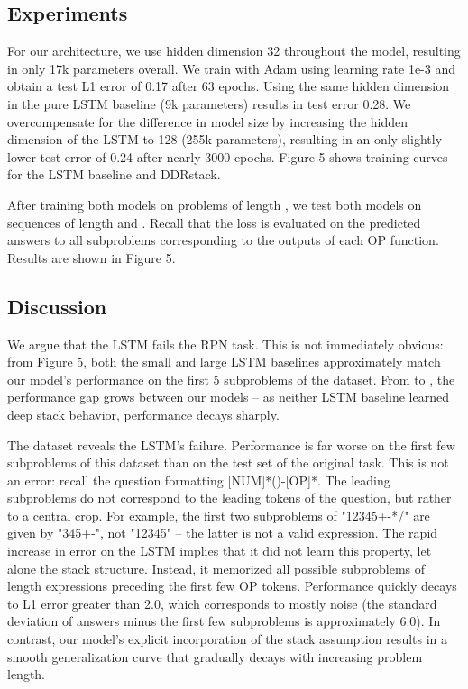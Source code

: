 \documentclass{article}
\begin{document}
\subsection{Experiments}
For our architecture, we use hidden dimension 32 throughout the model, resulting in only 17k parameters overall. We train with Adam using learning rate 1e-3 and obtain a test L1 error of 0.17 after 63 epochs. Using the same hidden dimension in the pure LSTM baseline (9k parameters) results in test error 0.28. We overcompensate for the difference in model size by increasing the hidden dimension of the LSTM to 128 (255k parameters), resulting in an only slightly lower test error of 0.24 after nearly 3000 epochs. Figure 5 shows training curves for the LSTM baseline and DDRstack.

After training both models on problems of length , we test both models on sequences of length  and . Recall that the loss is evaluated on the predicted answers to all  subproblems corresponding to the outputs of each OP function. Results are shown in Figure 5.

\subsection{Discussion}
We argue that the LSTM fails the RPN task. This is not immediately obvious: from Figure 5, both the small and large LSTM baselines approximately match our model's performance on the first 5 subproblems of the  dataset. From  to , the performance gap grows between our models -- as neither LSTM baseline learned deep stack behavior, performance decays sharply. 

The  dataset reveals the LSTM's failure. Performance is far worse on the first few subproblems of this dataset than on the test set of the original task. This is not an error: recall the question formatting [NUM]*()-[OP]*. The leading subproblems do not correspond to the leading tokens of the question, but rather to a central crop. For example, the first two subproblems of "12345+-*/" are given by "345+-", not "12345" -- the latter is not a valid expression. The rapid increase in error on the LSTM implies that it did not learn this property, let alone the stack structure. Instead, it memorized all possible subproblems of length  expressions preceding the first few OP tokens. Performance quickly decays to L1 error greater than 2.0, which corresponds to mostly noise (the standard deviation of answers minus the first few subproblems is approximately 6.0). In contrast, our model's explicit incorporation of the stack assumption results in a smooth generalization curve that gradually decays with increasing problem length.
\end{document}
